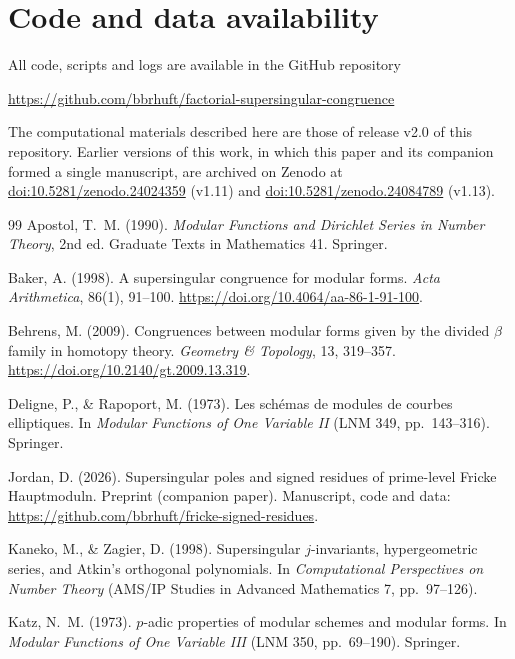 \documentclass[11pt,a4paper]{article}
\numberwithin{equation}{section}
\theoremstyle{definition}
\theoremstyle{remark}
\begin{document}
\section*{Code and data availability}
All code, scripts and logs are available in the GitHub repository
\begin{center}\url{https://github.com/bbrhuft/factorial-supersingular-congruence}\end{center}
The computational materials described here are those of release v2.0 of this repository.
Earlier versions of this work, in which this paper and its companion formed a single
manuscript, are archived on Zenodo at
\href{https://doi.org/10.5281/zenodo.24024359}{doi:10.5281/zenodo.24024359} (v1.11) and
\href{https://doi.org/10.5281/zenodo.24084789}{doi:10.5281/zenodo.24084789} (v1.13).

\begin{thebibliography}{99}\small
{} Apostol, T.~M. (1990). \emph{Modular Functions and Dirichlet Series in Number Theory}, 2nd ed. Graduate Texts in Mathematics 41. Springer.


 Baker, A. (1998). A supersingular congruence for modular forms.
\emph{Acta Arithmetica}, 86(1), 91--100. \url{https://doi.org/10.4064/aa-86-1-91-100}.


 Behrens, M. (2009). Congruences between modular forms given by the divided $\beta$ family in homotopy theory. \emph{Geometry \& Topology}, 13, 319--357. \url{https://doi.org/10.2140/gt.2009.13.319}.


 Deligne, P., \& Rapoport, M. (1973). Les sch\'emas de modules de
courbes elliptiques. In \emph{Modular Functions of One Variable II} (LNM 349, pp.~143--316). Springer.


 Jordan, D. (2026). Supersingular poles and signed residues of
prime-level Fricke Hauptmoduln. Preprint (companion paper). Manuscript, code and data: \url{https://github.com/bbrhuft/fricke-signed-residues}.

 Kaneko, M., \& Zagier, D. (1998). Supersingular $j$-invariants,
hypergeometric series, and Atkin's orthogonal polynomials. In \emph{Computational Perspectives on Number
Theory} (AMS/IP Studies in Advanced Mathematics 7, pp.~97--126).


 Katz, N.~M. (1973). $p$-adic properties of modular schemes and modular forms.
In \emph{Modular Functions of One Variable III} (LNM 350, pp.~69--190). Springer.



\end{thebibliography}
\end{document}
